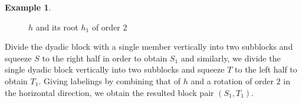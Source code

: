 \documentclass[12pt,reqno]{amsart}
\theoremstyle{plain}
\theoremstyle{definition}
\newtheorem{example}[definition]{Example}
\theoremstyle{remark}
\numberwithin{equation}{section}
\begin{document}
\begin{example}
\begin{figure}[htp]
\begin{center}
                 	\caption{$h$  and its root  $h_1$  of order  $2$}
			\label{Fig:Root}
		\end{center} 	
	\end{figure} 
\end{example} 
        
Divide the dyadic block with a single member vertically into two subblocks
and squeeze $S$ to the right half in order to obtain  $S_1$  and similarly, 
we divide the single dyadic block vertically into two subblocks 
and squeeze $T$ to the left half to obtain  $T_1$.  
Giving labelings by combining that of  $h$  and 
a rotation of  order  $2$  in the horizontal direction, 
we obtain the resulted block pair  $(S_1, T_1)$. 
\end{document}
